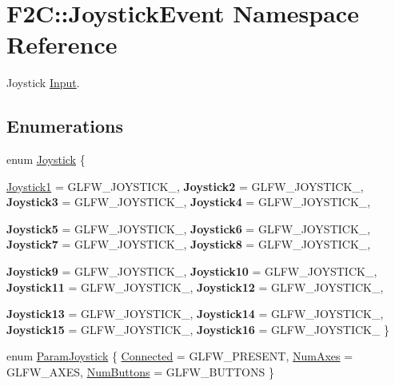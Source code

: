 \hypertarget{namespace_f2_c_1_1_joystick_event}{
\section{F2C::JoystickEvent Namespace Reference}
\label{namespace_f2_c_1_1_joystick_event}
}


Joystick \hyperlink{class_f2_c_1_1_input}{Input}.  
\subsection*{Enumerations}
\begin{DoxyCompactItemize}
\item 
enum \hyperlink{namespace_f2_c_1_1_joystick_event_ada0230f460f765718db17ac021cbfc1f}{Joystick} \{ \par
\hyperlink{namespace_f2_c_1_1_joystick_event_ada0230f460f765718db17ac021cbfc1fa4034419a862baa7e71c2daafe7811546}{Joystick1} =  GLFW\_\-JOYSTICK\_, 
{\bfseries Joystick2} =  GLFW\_\-JOYSTICK\_, 
{\bfseries Joystick3} =  GLFW\_\-JOYSTICK\_, 
{\bfseries Joystick4} =  GLFW\_\-JOYSTICK\_, 
\par
{\bfseries Joystick5} =  GLFW\_\-JOYSTICK\_, 
{\bfseries Joystick6} =  GLFW\_\-JOYSTICK\_, 
{\bfseries Joystick7} =  GLFW\_\-JOYSTICK\_, 
{\bfseries Joystick8} =  GLFW\_\-JOYSTICK\_, 
\par
{\bfseries Joystick9} =  GLFW\_\-JOYSTICK\_, 
{\bfseries Joystick10} =  GLFW\_\-JOYSTICK\_, 
{\bfseries Joystick11} =  GLFW\_\-JOYSTICK\_, 
{\bfseries Joystick12} =  GLFW\_\-JOYSTICK\_, 
\par
{\bfseries Joystick13} =  GLFW\_\-JOYSTICK\_, 
{\bfseries Joystick14} =  GLFW\_\-JOYSTICK\_, 
{\bfseries Joystick15} =  GLFW\_\-JOYSTICK\_, 
{\bfseries Joystick16} =  GLFW\_\-JOYSTICK\_
 \}
\item 
enum \hyperlink{namespace_f2_c_1_1_joystick_event_ae71fc0f92f6dd24cc1ffe1bd14b6ed82}{ParamJoystick} \{ \hyperlink{namespace_f2_c_1_1_joystick_event_ae71fc0f92f6dd24cc1ffe1bd14b6ed82a6075441378e3a6b749817a8db0f0776e}{Connected} =  GLFW\_\-PRESENT, 
\hyperlink{namespace_f2_c_1_1_joystick_event_ae71fc0f92f6dd24cc1ffe1bd14b6ed82a53cdaff3a4d8928488b7ac6bee4a91a3}{NumAxes} =  GLFW\_\-AXES, 
\hyperlink{namespace_f2_c_1_1_joystick_event_ae71fc0f92f6dd24cc1ffe1bd14b6ed82a1a8d4120a6c283ece8cd39569fb94f9e}{NumButtons} =  GLFW\_\-BUTTONS
 \}
\end{DoxyCompactItemize}


